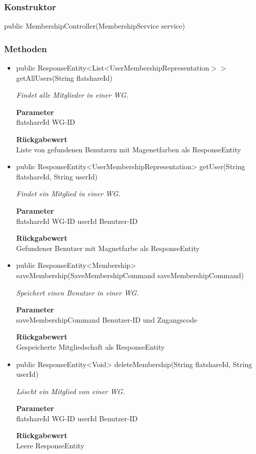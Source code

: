 \documentclass[a4paper]{scrreprt}
\begin{document}
        \subsubsection{Konstruktor}
        public MembershipController(MembershipService service)
        \subsubsection{Methoden}
        \begin{itemize}
        	\item{public ResponseEntity<List<UserMembershipRepresentation$>>$ getAllUsers(String flatshareId)}
        	
        	\textit{Findet alle Mitglieder in einer WG.}
        	
        	\textbf{Parameter} \\
        	flatshareId WG-ID
        	
        	\textbf{Rückgabewert} \\
        	Liste von gefundenen Benutzern mit Magenetfarben als ResponseEntity        \item{public ResponseEntity<UserMembershipRepresentation> getUser(String flatshareId, String userId)}
        	
        	\textit{Findet ein Mitglied in einer WG.}
        	
        	\textbf{Parameter} \\
        	flatshareId WG-ID
        	userId Benutzer-ID
        	
        	\textbf{Rückgabewert} \\
        	Gefundener Benutzer mit Magnetfarbe als ResponseEntity        \item{public ResponseEntity<Membership> saveMembership(SaveMembershipCommand saveMembershipCommand)}
        	
        	\textit{Speichert einen Benutzer in einer WG.}
        	
        	\textbf{Parameter} \\
        	saveMembershipCommand Benutzer-ID und Zugangscode
        	
        	\textbf{Rückgabewert} \\
        	Gespeicherte Mitgliedschaft als ResponseEntity        \item{public ResponseEntity<Void> deleteMembership(String flatshareId, String userId)}
        	
        	\textit{Löscht ein Mitglied von einer WG.}
        	
        	\textbf{Parameter} \\
        	flatshareId WG-ID
        	userId Benutzer-ID
        	
        	\textbf{Rückgabewert} \\
        	Leere ResponseEntity
        \end{itemize}
\end{document}
